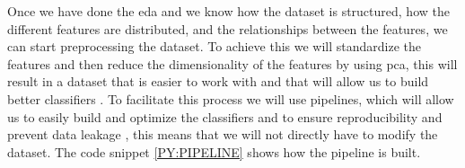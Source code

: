 Once we have done the \ac{eda} and we know how the dataset is structured, how the different features are distributed, and the relationships between the features, we can start preprocessing the dataset. To achieve this we will standardize the features and then reduce the dimensionality of the features by using \ac{pca}, this will result in a dataset that is easier to work with and that will allow us to build better classifiers \cite{dinc_evaluation_2014}. To facilitate this process we will use pipelines, which will allow us to easily build and optimize the classifiers and to ensure reproducibility and prevent data leakage \cite{zhao_pre-process_2019}, this means that we 
will not 
directly have to modify the dataset. The code snippet \ref{PY:PIPELINE} shows how the pipeline is built.


